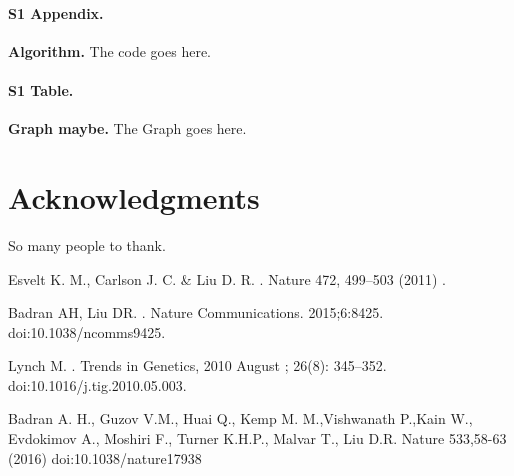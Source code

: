 \documentclass[10pt,letterpaper]{article}
\begin{document}
\paragraph*{S1 Appendix.}
\label{S1_Appendix}
{\bf Algorithm.} The code goes here.

\paragraph*{S1 Table.}
\label{S1_Table}
{\bf Graph maybe.} The Graph goes here.

\section*{Acknowledgments}
So many people to thank.

\nolinenumbers

\begin{thebibliography}{10}

Esvelt K. M., Carlson J. C. \& Liu D. R.
.
\newblock Nature 472, 499–503 (2011) .

Badran AH, Liu DR.
.
\newblock Nature Communications. 2015;6:8425. doi:10.1038/ncomms9425.

Lynch M.
.
\newblock Trends in Genetics, 2010 August ; 26(8): 345–352. doi:10.1016/j.tig.2010.05.003.

  Badran A. H., Guzov V.M., Huai Q., Kemp M. M.,Vishwanath P.,Kain W., Evdokimov A., Moshiri F., Turner K.H.P., Malvar T., Liu D.R.
  \newblock  Nature 533,58-63 (2016) doi:10.1038/nature17938
\end{thebibliography}
\end{document}
